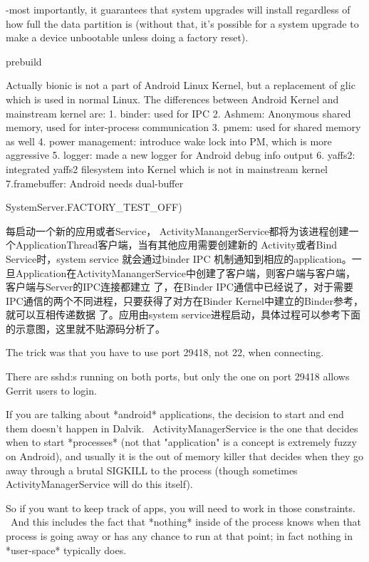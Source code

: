 \documentclass{book}
\begin{document}
\begin{CJK}{UTF8}{gbsn}
-most importantly, it guarantees that system upgrades will install
regardless of how full the data partition is (without that, it's
possible for a system upgrade to make a device unbootable unless doing
a factory reset).

prebuild






Actually bionic is not a part of Android Linux Kernel, but a replacement of
glic which is used in normal Linux.
The differences between Android Kernel and mainstream kernel are:
1. binder: used for IPC
2. Ashmem: Anonymous shared memory, used for inter-process communication
3. pmem: used for shared memory as well
4. power management: introduce wake lock into PM, which is more aggressive
5. logger: made a new logger for Android debug info output
6. yaffs2: integrated yaffs2 filesystem into Kernel which is not in
mainstream kernel
7.framebuffer: Android needs dual-buffer 

SystemServer.FACTORY_TEST_OFF)

每启动一个新的应用或者Service， ActivityManangerService都将为该进程创建一个ApplicationThread客户端，当有其他应用需要创建新的 Activity或者Bind Service时，system service 就会通过binder IPC 机制通知到相应的application。一旦Application在ActivityManangerService中创建了客户端，则客户端与客户端，客户端与Server的IPC连接都建立 了，在Binder IPC通信中已经说了，对于需要IPC通信的两个不同进程，只要获得了对方在Binder Kernel中建立的Binder参考，就可以互相传递数据 了。应用由system service进程启动，具体过程可以参考下面的示意图，这里就不贴源码分析了。

The trick was that you have to use port 29418, not 22, when
connecting.

There are sshd:s running on both ports, but only the one on port 29418
allows
Gerrit users to login.


If you are talking about *android* applications, the decision to start and end them doesn't happen in Dalvik.  ActivityManagerService is the one that decides when to start *processes* (not that "application" is a concept is extremely fuzzy on Android), and usually it is the out of memory killer that decides when they go away through a brutal SIGKILL to the process (though sometimes ActivityManagerService will do this itself). 

So if you want to keep track of apps, you will need to work in those constraints.  And this includes the fact that *nothing* inside of the process knows when that process is going away or has any chance to run at that point; in fact nothing in *user-space* typically does. 


\end{CJK}
\end{document}
